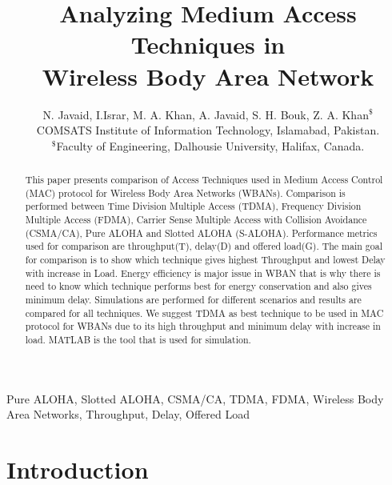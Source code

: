 \documentclass[11pt, conference, compsocconf, onecolumn]{IEEEtran}
\begin{document}
\title{Analyzing Medium Access Techniques in\\ Wireless Body Area Network}

\author{N. Javaid, I.Israr, M. A. Khan, A. Javaid, S. H. Bouk, Z. A. Khan$^{\$}$\\
COMSATS Institute of Information Technology, Islamabad, Pakistan. \\
        $^{\$}$Faculty of Engineering, Dalhousie University, Halifax, Canada.\\
     }

\maketitle


\begin{abstract}
This paper presents comparison of Access Techniques used in Medium Access Control (MAC) protocol for Wireless Body Area Networks (WBANs). Comparison is performed between Time Division Multiple Access (TDMA), Frequency Division Multiple Access (FDMA), Carrier Sense Multiple Access with Collision Avoidance (CSMA/CA), Pure ALOHA and Slotted ALOHA (S-ALOHA). Performance metrics used for comparison are throughput(T), delay(D) and offered load(G). The main goal for comparison is to show which technique gives highest Throughput and lowest Delay with increase in Load. Energy efficiency is major issue in WBAN that is why there is need to know which technique performs best for energy conservation and also gives minimum delay. Simulations are performed for different scenarios and results are compared for all techniques. We suggest TDMA as best technique to be used in MAC protocol for WBANs due to its high throughput and minimum delay with increase in load. MATLAB is the tool that is used for simulation.

\end{abstract}

\begin{IEEEkeywords}

Pure ALOHA, Slotted ALOHA, CSMA/CA, TDMA, FDMA, Wireless Body Area Networks, Throughput, Delay, Offered Load

\end{IEEEkeywords}


\section{Introduction}
\end{document}
